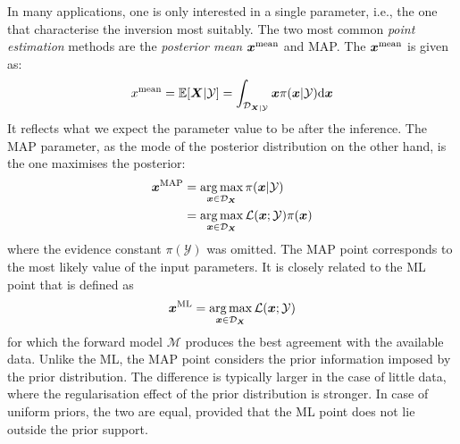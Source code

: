 In many applications, one is only interested in a single parameter, i.e., the one that characterise the inversion most suitably. The two most common \textit{point estimation} methods are the \textit{posterior mean} $\boldsymbol{x}^{\rm{mean}}$ and \acrfull{MAP}. The $\boldsymbol{x}^{\rm{mean}}$ is given as:
\begin{equation}
    \label{eq: posterior mean}
    x^{\rm{mean}} = \mathbb{E}[\boldsymbol{X}|\mathcal{Y}] = \int_{\mathcal{D}_{\boldsymbol{X}|\mathcal{Y}}} 
    \boldsymbol{x} \pi(\boldsymbol{x}|\mathcal{Y}) {\rm{d}} \boldsymbol{x}  
\end{equation}
It reflects what we expect the parameter value to be after the inference. The \acrshort{MAP} parameter, as the mode of the posterior distribution on the other hand, is the one maximises the posterior:
\begin{equation}
    \label{eq: MAP}
    \begin{aligned}
       \boldsymbol{x}^{\rm{MAP}} &= \mathop{\arg\max}\limits_{\boldsymbol{x} \in \mathcal{D}_{\boldsymbol{X}}}
    \pi(\boldsymbol{x}|\mathcal{Y}) \\
    &=\mathop{\arg\max}\limits_{\boldsymbol{x} \in \mathcal{D}_{\boldsymbol{X}}}
   {\mathcal{L}(\boldsymbol{x};\mathcal{Y}) \pi(\boldsymbol{x})}     
    \end{aligned}
\end{equation}
where the evidence constant $\pi(\mathcal{Y})$ was omitted. The \acrshort{MAP} point corresponds to the most likely value of the input parameters. It is closely related to the \acrfull{ML} point that is defined as 
\begin{equation}
    \label{eq: MLE}
    \boldsymbol{x}^{\rm{ML}}  = \mathop{\arg\max}\limits_{\boldsymbol{x} \in \mathcal{D}_{\boldsymbol{X}}}
   {\mathcal{L}(\boldsymbol{x};\mathcal{Y})}
\end{equation}
for which the forward model $\mathcal{M}$ produces the best agreement with the available data. Unlike the \acrshort{ML}, the \acrshort{MAP} point considers the prior information imposed by the prior distribution. The difference is typically larger in the case of little data, where the regularisation effect of the prior distribution is stronger. In case of uniform priors, the two are equal, provided that the \acrshort{ML} point does not lie outside the prior support.

